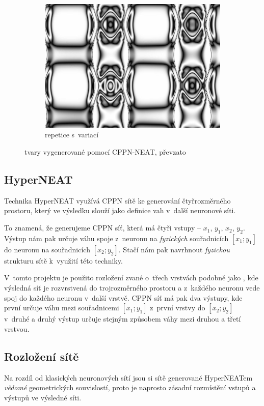 \documentclass[a4]{article}
\begin{document}
\begin{figure}[b]
\begin{subfigure}[b]{0.3\textwidth}
        \includegraphics[width=\textwidth]{cppn3}
        \caption{repetice s~variací}
        \label{fig:repvar}
    \end{subfigure}
    \caption{tvary vygenerované pomocí CPPN-NEAT, převzato\cite{hyperneat}}\label{fig:cppn}
\end{figure}
\subsection{HyperNEAT}
Technika HyperNEAT\cite{hyperneat} využívá CPPN sítě ke generování čtyřrozměrného prostoru, který ve výsledku slouží jako definice vah v~další neuronové síti.\par
To znamená, že generujeme CPPN síť, která má čtyři vstupy -- $x_1$, $y_1$, $x_2$, $y_2$. Výstup nám pak určuje váhu spoje z~neuronu na \emph{fyzických} souřadnicích $[x_1;y_1]$ do neuronu na souřadnicích $[x_2;y_2]$. Stačí nám pak navrhnout \emph{fyzickou} strukturu sítě k~využití této techniky.\par
V~tomto projektu je použito rozložení zvané \emph{}\cite{hyperneat} o~třech vrstvách podobně jako \cite{clunegait}, kde výsledná síť je rozvrstvená do trojrozměrného prostoru a z~každého neuronu vede spoj do každého neuronu v~další vrstvě. CPPN síť má pak dva výstupy, kde první určuje váhu mezi souřadnicemi $[x_1;y_1]$ z~první vrstvy do $[x_2;y_2]$ v~druhé a druhý výstup určuje stejným způsobem váhy mezi druhou a třetí vrstvou.\par
\subsection{Rozložení sítě}
Na rozdíl od klasických neuronových sítí jsou si sítě generované HyperNEATem \emph{vědomé} geometrických souvislostí\cite{hyperneat}, proto je naprosto zásadní rozmístění vstupů a výstupů ve výsledné síti.\par
\end{document}
